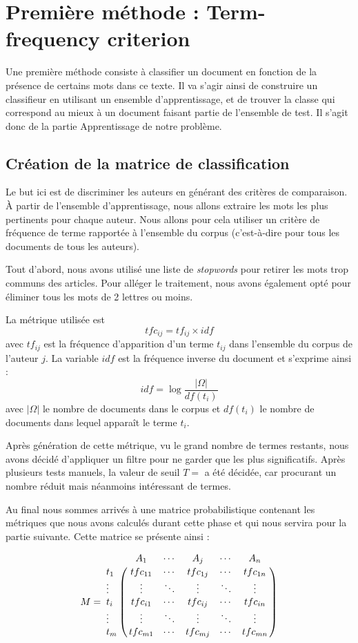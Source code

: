\documentclass[a4paper,12pt]{report}
\begin{document}
\section{Première méthode : Term-frequency criterion}
Une première méthode consiste à classifier un document en fonction de la présence de certains mots dans ce texte. Il va s'agir ainsi de construire un classifieur en utilisant un ensemble d'apprentissage, et de trouver la classe qui correspond au mieux à un document faisant partie de l'ensemble de test. Il s'agit donc de la partie Apprentissage de notre problème.

\subsection{Création de la matrice de classification}
Le but ici est de discriminer les auteurs en générant des critères de comparaison. À partir de l'ensemble d'apprentissage, nous allons extraire les mots les plus pertinents pour chaque auteur. Nous allons pour cela utiliser un critère de fréquence de terme rapportée à l'ensemble du corpus (c'est-à-dire pour tous les documents de tous les auteurs).

Tout d'abord, nous avons utilisé une liste de \textit{stopwords} pour retirer les mots trop communs des articles. Pour alléger le traitement, nous avons également opté pour éliminer tous les mots de 2 lettres ou moins. 

La métrique utilisée est \[ tfc_{ij} = tf_{ij} \times idf\] avec $tf_{ij}$ est la fréquence d'apparition d'un terme $t_{ij}$ dans l'ensemble du corpus de l'auteur $j$. La variable $idf$ est la fréquence inverse du document et s'exprime ainsi : \[idf = \log \frac{|\Omega|}{df(t_{i})} \] avec $|\Omega|$ le nombre de documents dans le corpus et $df(t_{i})$ le nombre de documents dans lequel apparaît le terme $t_{i}$.

Après génération de cette métrique, vu le grand nombre de termes restants, nous avons décidé d'appliquer un filtre pour ne garder que les plus significatifs. Après plusieurs tests manuels, la valeur de seuil $T = $  a été décidée, car procurant un nombre réduit mais néanmoins intéressant de termes.

Au final nous sommes arrivés à une matrice probabilistique contenant les métriques que nous avons calculés durant cette phase et qui nous servira pour la partie suivante. Cette matrice se présente ainsi :

\[M=\bordermatrix{
&A_{1}&\cdots&A_{j}&\cdots&A_{n}\cr
t_{1}& tfc_{11} & \cdots & tfc_{1j} & \cdots & tfc_{1n} \cr
\vdots&\vdots&\ddots&\vdots&\ddots&\vdots\cr
t_{i}& tfc_{i1} & \cdots & tfc_{ij} & \cdots & tfc_{in} \cr
\vdots&\vdots&\ddots&\vdots&\ddots&\vdots\cr
t_{m}& tfc_{m1} & \cdots & tfc_{mj} & \cdots & tfc_{mn} \cr
}\]
\end{document}
